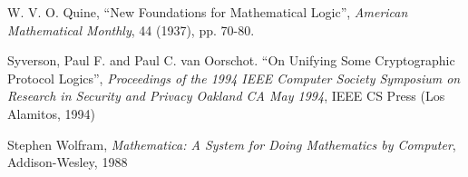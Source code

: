 \documentclass{kluwer}
\begin{document}
\begin{article}
\begin{thebibliography}{99}
 W. V. O. Quine, ``New Foundations for Mathematical Logic'', {\em
American Mathematical Monthly\/}, 44 (1937), pp. 70-80.

 Syverson, Paul F. and Paul C. van Oorschot. ``On
Unifying Some Cryptographic Protocol Logics'', {\em Proceedings of the
1994 IEEE Computer Society Symposium on Research in Security and
Privacy Oakland CA May 1994\/}, IEEE CS Press (Los Alamitos, 1994)


 Stephen Wolfram, {\em Mathematica: A System for
Doing Mathematics by Computer\/}, Addison-Wesley, 1988

\end{thebibliography}

\end{article}
\end{document}
